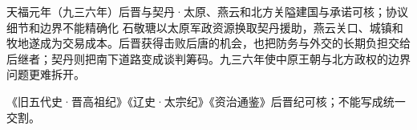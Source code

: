 \begin{event}{}{天福元年（九三六年）}{后晋与契丹·太原、燕云和北方关隘}{建国与承诺可核；协议细节和边界不能精确化}
石敬瑭以太原军政资源换取契丹援助，燕云关口、城镇和牧地遂成为交易成本。后晋获得击败后唐的机会，也把防务与外交的长期负担交给后继者；契丹则把南下道路变成谈判筹码。九三六年使中原王朝与北方政权的边界问题更难拆开。

《旧五代史·晋高祖纪》《辽史·太宗纪》《资治通鉴》后晋纪可核；不能写成统一交割。
\end{event}
